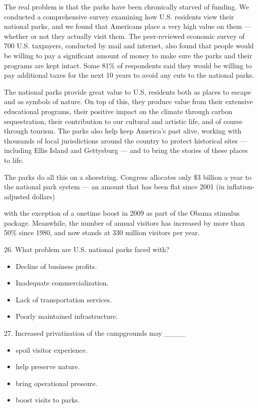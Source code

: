 \documentclass[UTF8,11pt]{ctexart}
\begin{document}
The real problem is that the parks have been chronically starved of funding. We conducted a comprehensive survey examining how U.S. residents view their national parks, and we found that Americans place a very high value on them — whether or not they actually visit them. The peer-reviewed economic survey of 700 U.S. taxpayers, conducted by mail and internet, also found that people would be willing to pay a significant amount of money to make sure the parks and their programs are kept intact. Some 81\% of respondents said they would be willing to pay additional taxes for the next 10 years to avoid any cuts to the national parks.


The national parks provide great value to U.S. residents both as places to escape and as symbols of nature. On top of this, they produce value from their extensive educational programs, their positive impact on the climate through carbon sequestration, their contribution to our cultural and artistic life, and of course through tourism. The parks also help keep America’s past alive, working with thousands of local jurisdictions around the country to protect historical sites — including Ellis Island and Gettysburg — and to bring the stories of these places to life.


The parks do all this on a shoestring. Congress allocates only \$3 billion a year to the national park system — an amount that has been flat since 2001 (in inflation-adjusted dollars)


with the exception of a onetime boost in 2009 as part of the Obama stimulus package. Meanwhile, the number of annual visitors has increased by more than 50\% since 1980, and now stands at 330 million visitors per year.


26. What problem are U.S. national parks faced with?


\begin{itemize}[leftmargin=2em,itemsep=.2em,topsep=.4em]\item[A.] Decline of business profits.
\item[B.] Inadequate commercialization.
\item[C.] Lack of transportation services.
\item[D.] Poorly maintained infrastructure.
\end{itemize}

27. Increased privatization of the campgrounds may \_\_\_\_


\begin{itemize}[leftmargin=2em,itemsep=.2em,topsep=.4em]\item[A.] spoil visitor experience.
\item[B.] help preserve nature.
\item[C.] bring operational pressure.
\item[D.] boost visits to parks.
\end{itemize}
\end{document}
